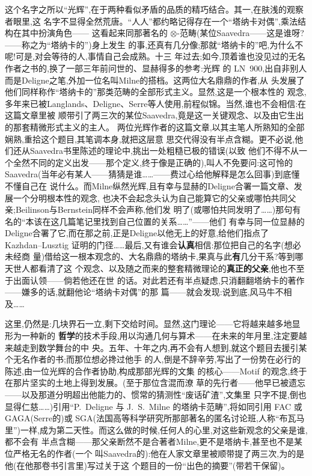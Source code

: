 这个名字之所以“光辉”,在于两种看似矛盾的品质的精巧结合。其一,在肤浅的观察者眼里,这
名字不显得全然荒唐。“人人”都约略记得存在一个“塔纳卡对偶”,乘法结构在其中扮演角色——
这看起来同那著名的 $\otimes$-范畴(某位Saavedra——这是谁呀?——称之为“塔纳卡的”)身上发生
的事,还真有几分像;那就“塔纳卡的”吧,为什么不呢!可是,对会等待的人,事情自己会成熟。十三
年过去;如今,顶着谁也没见过的无名作者之书的,换了一部三年前问世的、显赫得多的参考:光辉
的 LN~900,出自非别人而是Deligne之笔,外加一位名叫Milne的搭档。这两位大名鼎鼎的作者,从
头发展了他们同样称作“塔纳卡的”那类范畴的全部形式主义。显然,这是一个根本性的
观念,多年来已被Langlands、Deligne、Serre等人使用,前程似锦。当然,谁也不会相信:在这篇文章里被
顺带引了两三次的某位Saavedra,竟是这一关键观念、以及由它生出的那套精微形式主义的主人。
两位光辉作者的这篇文章,以其主笔人所熟知的全部娴熟,重拾这个题目,其笔调本身,就把这层意\dmark{}
思交代得没有半点含糊。更不必说,他们还从Saavedra书里陈述的理论中,挑出一处粗糙已极的错误(以致
他们不得不从一个全然不同的定义出发——那个定义,终于像是正确的),叫人不免要问:这可怜的
Saavedra(当年必有某人——猜猜是谁……——费过心给他解释是怎么回事)到底懂不懂自己在
说什么。而Milne纵然光辉,且有幸与显赫的Deligne合署一篇文章、发展一个分明根本性的观念,
也决不会起念头认为自己能算它的父亲或哪怕共同父亲;Beilinson与Bernstein同样不会声称,他们发
明了(或哪怕共同发明了……)那句有名的“本该在这几篇笔记里找到自己位置的关系……”——他们
有幸与同一位显赫的Deligne合署了它,而在那之前,正是Deligne以他无上的好意,给他们指点了
Kazhdan--Lusztig 证明的门径……最后,又有谁会\textbf{认真}相信:那位把自己的名字(想必未经商
量)借给这一根本观念的、大名鼎鼎的塔纳卡,果真与此\textbf{有}几分干系?等到哪天世人都看清了这
个观念、以及随之而来的整套精微理论的\textbf{真正的父亲},他也不至于出面认领——倘若他还在世
的话。对此若还有半点疑虑,只消翻翻塔纳卡的著作——嫌多的话,就翻他论“塔纳卡对偶”的那
篇——就会发现:说到底,风马牛不相及……

这里,仍然是:几块界石一立,剩下交给时间。显然,这门理论——它将越来越多地显形为一种新的
\textbf{哲学}的技术手段,用以沟通几何与算术——在未来的年月里,注定要越来越走到数学舞台的中
央。五年、十年之内,再不会有人想到,就这个题目去援引某个无名作者的书;而那位想必搀过他手
的人,倒是不辞辛劳,写出了一份势在必行的陈述,由一位光辉的合作者协助,构成那部光辉的文集
的核心——Motif 的观念,终于在\dmark{}那片坚实的土地上得到发展。(至于那位含混而潦
草的先行者——他早已被遗忘——以及那道分明超出他能力的、惯常的猜测性“废话矿渣”,文集里
只字不提,倒也显得仁慈……)引用“P.~Deligne 与 J.~S.~Milne 的塔纳卡范畴”,将如同引用
FAC 或 GAGA(Serre的)或 SGA(法国高等科学研究所那部著名的匿名讨论班,人称“布瓦马
里”)一样,成为第二天性。而这么做的时候,任何人的心里,对这些新观念的父亲是谁,都不会有
半点含糊——那父亲断然不是合著者Milne,更不是塔纳卡,甚至也不是某位严格无名的作者(一个
叫Saavedra的):他在人家文章里被顺带提了两三次,为的是他(在他那卷书引言里)写过关于这
个题目的一份“出色的摘要”(带若干保留)。

